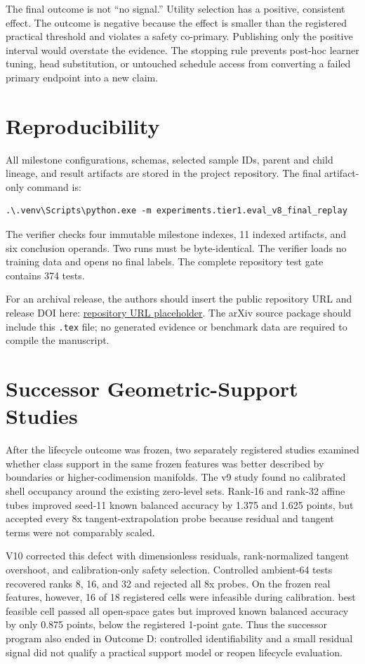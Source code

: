 \documentclass[10pt]{article}
\begin{document}
The final outcome is not ``no signal.'' Utility selection has a positive,
consistent effect. The outcome is negative because the effect is smaller than
the registered practical threshold and violates a safety co-primary.
Publishing only the positive interval would overstate the evidence. The
stopping rule prevents post-hoc learner tuning, head substitution, or untouched
schedule access from converting a failed primary endpoint into a new claim.

\section{Reproducibility}

All milestone configurations, schemas, selected sample IDs, parent and child
lineage, and result artifacts are stored in the project repository. The final
artifact-only command is:

\begin{verbatim}
.\.venv\Scripts\python.exe -m experiments.tier1.eval_v8_final_replay
\end{verbatim}

The verifier checks four immutable milestone indexes, 11 indexed artifacts,
and six conclusion operands. Two runs must be byte-identical. The verifier
loads no training data and opens no final labels. The complete repository test
gate contains 374 tests.

For an archival release, the authors should insert the public repository URL
and release DOI here:
\href{https://example.com/repository}{repository URL placeholder}.
The arXiv source package should include this \texttt{.tex} file; no generated
evidence or benchmark data are required to compile the manuscript.

\section{Successor Geometric-Support Studies}

After the lifecycle outcome was frozen, two separately registered studies
examined whether class support in the same frozen features was better described
by boundaries or higher-codimension manifolds. The v9 study found no calibrated
shell occupancy around the existing zero-level sets. Rank-16 and rank-32 affine
tubes improved seed-11 known balanced accuracy by 1.375 and 1.625 points, but
accepted every 8x tangent-extrapolation probe because residual and tangent terms
were not comparably scaled.

V10 corrected this defect with dimensionless residuals, rank-normalized tangent
overshoot, and calibration-only safety selection. Controlled ambient-64 tests
recovered ranks 8, 16, and 32 and rejected all 8x probes. On the frozen real
features, however, 16 of 18 registered cells were infeasible during calibration.
best feasible cell passed all open-space gates but improved known balanced
accuracy by only 0.875 points, below the registered 1-point gate. Thus the
successor program also ended in Outcome D: controlled identifiability and a
small residual signal did not qualify a practical support model or reopen
lifecycle evaluation.
\end{document}

